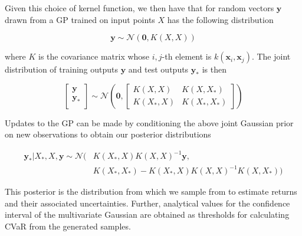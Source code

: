 \documentclass[12pt]{article}
\begin{document}
Given this choice of kernel function, we then have that for random vectors $\bm{y}$ drawn from a GP trained on input points $X$ has the following distribution

\begin{equation}
\bm{y} \sim \mathcal{N}(\bm{0}, K(X,X))
\label{eq:gp dist}
\end{equation}

where $K$ is the covariance matrix whose $i,j$-th element is $k(\bm{x}_i, \bm{x}_j)$. The joint distribution of training outputs $\bm{y}$ and test outputs $\bm{y_*}$ is then 

\begin{equation}
\begin{bmatrix}
\bm{y} \\
\bm{y_*} \\
\end{bmatrix}
\sim \mathcal{N}\left(
\bm{0},
\begin{bmatrix}
K(X,X) & K(X,X_*) \\
K(X_*,X) & K(X_*,X_*) 
\end{bmatrix}
\right)
\label{eq:gp post}
\end{equation}

Updates to the GP can be made by conditioning the above joint Gaussian prior on new observations to obtain our posterior distributions 


\begin{equation}
\begin{split}
\bm{y_*}|X_*,X,\bm{y} \sim \mathcal{N}( & K(X_*,X)K(X,X)^{-1}\bm{y}, \\
& K(X_*,X_*) - K(X_*,X)K(X,X)^{-1}K(X,X_*))
\end{split}
\end{equation}

This posterior is the distribution from which we sample from to estimate returns and their associated uncertainties. Further, analytical values for the confidence interval of the multivariate Gaussian are obtained as thresholds for calculating CVaR from the generated samples.
\end{document}
